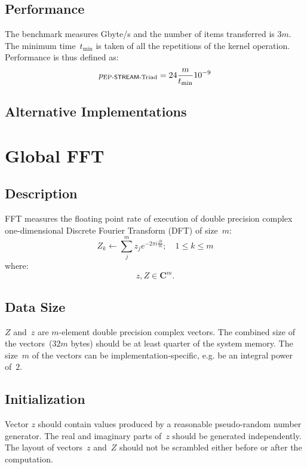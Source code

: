\documentclass[twocolumn]{article}
\newcommand{\FFT}{\textsf{FFT}\xspace}
\newcommand{\STREAM}{\textsf{STREAM}\xspace}
\begin{document}
\subsection{Performance}
The benchmark measures Gbyte/s and the number of items transferred is $3m$. The
minimum time~$t_{\min}$ is taken of all the repetitions of the kernel
operation. Performance is thus defined as:
\begin{equation}
  p_{\textrm{\scriptsize{}EP-\STREAM{}-Triad}} = 24\frac{m}{t_{\min}}10^{-9}
\end{equation}

\subsection{Alternative Implementations}

\section{Global \FFT}

\subsection{Description}
\FFT measures the floating point rate of execution of double precision
complex one-dimensional Discrete Fourier Transform (DFT) of size~$m$:
\begin{equation}
Z_k\leftarrow\sum_j^m z_j e^{-2\pi i\frac{jk}{m}}; \quad 1 \le k \le m
\label{eqn:ffft}
\end{equation}
where:
\[z, Z\in\mathbf{C}^m.\]

\subsection{Data Size}
$Z$ and~$z$ are $m$-element double precision complex vectors. The combined size
of the vectors~($32m$ bytes) should be at least quarter of the system memory.
The size~$m$ of the vectors can be implementation-specific, e.g. be an integral
power of~$2$.

\subsection{Initialization}
Vector $z$ should contain values produced by a reasonable pseudo-random number
generator. The real and imaginary parts of~$z$ should be generated
independently. The layout of vectors~$z$ and~$Z$ should not be scrambled either
before or after the computation.
\end{document}
